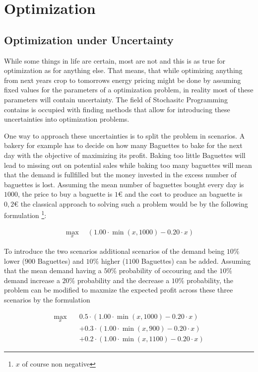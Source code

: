 
\chapter{Optimization}\label{section:optimization}

\section{Optimization under Uncertainty}

While some things in life are certain, most are not and this is as true for optimization as for anything else. That means, that while optimizing anything from next years crop to tomorrows energy pricing might be done by assuming fixed values for the parameters of a optimization problem, in reality most of these parameters will contain uncertainty. The field of Stochasitc Programming contains is occupied with finding methods that allow for introducing these uncertainties into optimization problems.

One way to approach these uncertainties is to split the problem in scenarios. A bakery for example has to decide on how many Baguettes to bake for the next day with the objective of maximizing its profit. Baking too little Baguettes will lead to missing out on potential sales while baking too many baguettes will mean that the demand is fullfilled but the money invested in the excess number of baguettes is lost. Assuming the mean number of baguettes bought every day is $1000$, the price to buy a baguette is $1 €$ and the cost to produce an baguette is $0,2 €$ the classical approach to solving such a problem would be by the following formulation \footnote{$x$ of course non negative}: 


\begin{align*}
	\max_{x} \quad \left( 1.00 \cdot \min(x,1000) - 0.20 \cdot x \right)
\end{align*}


To introduce the two scenarios additional scenarios of the demand being $10\%$ lower ($900$ Baguettes) and $10\%$ higher ($1100$ Baguettes) can be added. Assuming that the mean demand having a $50\%$ probability of occouring and the $10\%$ demand increase a $20\%$ probability and the decrease a $10\%$  probability, the problem can be modified to maxmize the expected profit across these three scenarios by the formulation

\begin{align*}
	\max_{x} \quad & 0.5 \cdot \left(1.00 \cdot \min(x,1000) - 0.20 \cdot x \right) \\
	&+ 0.3 \cdot \left(1.00 \cdot \min(x,900) - 0.20 \cdot x\right) \\
	&+ 0.2 \cdot \left(1.00 \cdot \min(x,1100) - 0.20 \cdot x\right)
\end{align*}

